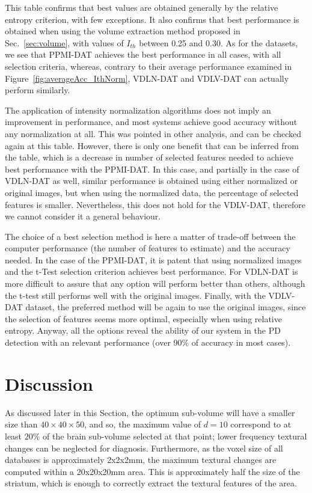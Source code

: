 This table confirms that best values are obtained generally by the relative entropy criterion, with few exceptions. It also confirms that best performance is obtained when using the volume extraction method proposed in Sec.~\ref{sec:volume}, with values of $I_{th}$ between 0.25 and 0.30. As for the datasets, we see that PPMI-DAT achieves the best performance in all cases, with all selection criteria, whereas, contrary to their average performance examined in Figure~\ref{fig:averageAcc_IthNorm}, VDLN-DAT and VDLV-DAT can actually perform similarly. 

The application of intensity normalization algorithms does not imply an improvement in performance, and most systems achieve good accuracy without any normalization at all. This was pointed in other analysis, and can be checked again at this table. However, there is only one benefit that can be inferred from the table, which is a decrease in number of selected features needed to achieve best performance with the PPMI-DAT. In this case, and partially in the case of VDLN-DAT as well, similar performance is obtained using either normalized or original images, but when using the normalized data, the percentage of selected features is smaller. Nevertheless, this does not hold for the VDLV-DAT, therefore we cannot consider it a general behaviour. 

The choice of a best selection method is here a matter of trade-off between the computer performance (the number of features to estimate) and the accuracy needed. In the case of the PPMI-DAT, it is patent that using normalized images and the t-Test selection criterion achieves best performance. For VDLN-DAT is more difficult to assure that any option will perform better than others, although the t-test still performs well with the original images. Finally, with the VDLV-DAT dataset, the preferred method will be again to use the original images, since the selection of features seems more optimal, especially when using relative entropy. Anyway, all the options reveal the ability of our system in the PD detection with an relevant performance (over 90\% of accuracy in most cases). 

\section{Discussion}\label{sec:ch5discuss}
As discussed later in this Section, the optimum sub-volume will have a smaller size than $40\times40\times50$, and so, the maximum value of $d=10$ correspond to at least $20\%$ of the brain sub-volume selected at that point; lower frequency textural changes can be neglected for diagnosis. Furthermore, as the voxel size of all databases is approximately 2x2x2mm, the maximum textural changes are computed within a 20x20x20mm area. This is approximately half the size of the striatum, which is enough to correctly extract the textural features of the area. 



